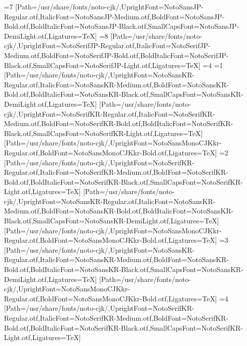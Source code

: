 \else\ifnum\value{CJKFonts}=7
[Path=/usr/share/fonts/noto-cjk/,UprightFont=NotoSansJP-Regular.otf,ItalicFont=NotoSansJP-Medium.otf,BoldFont=NotoSansJP-Bold.otf,BoldItalicFont=NotoSansJP-Black.otf,SmallCapsFont=NotoSansJP-DemiLight.otf,Ligatures=TeX]
\else\ifnum\value{CJKFonts}=8
[Path=/usr/share/fonts/noto-cjk/,UprightFont=NotoSerifJP-Regular.otf,ItalicFont=NotoSerifJP-Medium.otf,BoldFont=NotoSerifJP-Bold.otf,BoldItalicFont=NotoSerifJP-Black.otf,SmallCapsFont=NotoSerifJP-Light.otf,Ligatures=TeX]
\fi\fi\fi\fi\fi\fi\fi\fi\else
\ifnum\value{CJKLanguage}=4
\ifnum\value{CJKFonts}=1
[Path=/usr/share/fonts/noto-cjk/,UprightFont=NotoSansKR-Regular.otf,ItalicFont=NotoSansKR-Medium.otf,BoldFont=NotoSansKR-Bold.otf,BoldItalicFont=NotoSansKR-Black.otf,SmallCapsFont=NotoSansKR-DemiLight.otf,Ligatures=TeX]
[Path=/usr/share/fonts/noto-cjk/,UprightFont=NotoSerifKR-Regular.otf,ItalicFont=NotoSerifKR-Medium.otf,BoldFont=NotoSerifKR-Bold.otf,BoldItalicFont=NotoSerifKR-Black.otf,SmallCapsFont=NotoSerifKR-Light.otf,Ligatures=TeX]
[Path=/usr/share/fonts/noto-cjk/,UprightFont=NotoSansMonoCJKkr-Regular.otf,BoldFont=NotoSansMonoCJKkr-Bold.otf,Ligatures=TeX]
\else\ifnum\value{CJKFonts}=2
[Path=/usr/share/fonts/noto-cjk/,UprightFont=NotoSerifKR-Regular.otf,ItalicFont=NotoSerifKR-Medium.otf,BoldFont=NotoSerifKR-Bold.otf,BoldItalicFont=NotoSerifKR-Black.otf,SmallCapsFont=NotoSerifKR-Light.otf,Ligatures=TeX]
[Path=/usr/share/fonts/noto-cjk/,UprightFont=NotoSansKR-Regular.otf,ItalicFont=NotoSansKR-Medium.otf,BoldFont=NotoSansKR-Bold.otf,BoldItalicFont=NotoSansKR-Black.otf,SmallCapsFont=NotoSansKR-DemiLight.otf,Ligatures=TeX]
[Path=/usr/share/fonts/noto-cjk/,UprightFont=NotoSansMonoCJKkr-Regular.otf,BoldFont=NotoSansMonoCJKkr-Bold.otf,Ligatures=TeX]
\else\ifnum\value{CJKFonts}=3
[Path=/usr/share/fonts/noto-cjk/,UprightFont=NotoSansKR-Regular.otf,ItalicFont=NotoSansKR-Medium.otf,BoldFont=NotoSansKR-Bold.otf,BoldItalicFont=NotoSansKR-Black.otf,SmallCapsFont=NotoSansKR-DemiLight.otf,Ligatures=TeX]
[Path=/usr/share/fonts/noto-cjk/,UprightFont=NotoSansMonoCJKkr-Regular.otf,BoldFont=NotoSansMonoCJKkr-Bold.otf,Ligatures=TeX]
\else\ifnum\value{CJKFonts}=4
[Path=/usr/share/fonts/noto-cjk/,UprightFont=NotoSerifKR-Regular.otf,ItalicFont=NotoSerifKR-Medium.otf,BoldFont=NotoSerifKR-Bold.otf,BoldItalicFont=NotoSerifKR-Black.otf,SmallCapsFont=NotoSerifKR-Light.otf,Ligatures=TeX]
